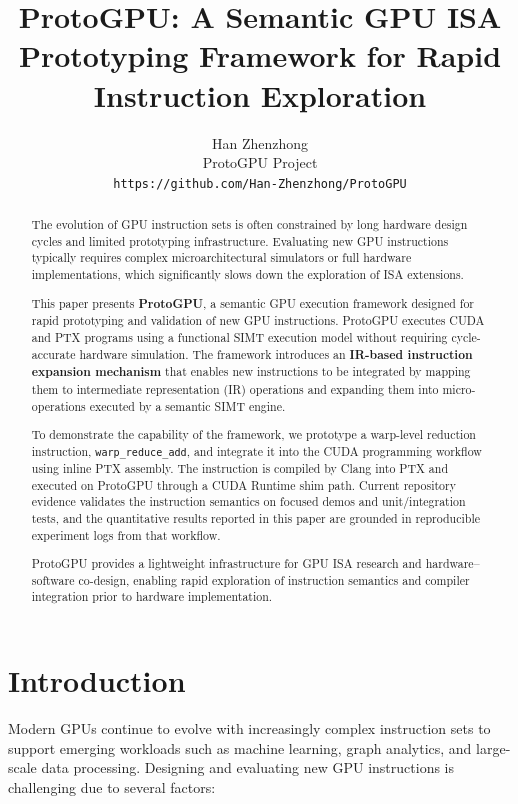 \documentclass[11pt]{article}
\title{ProtoGPU: A Semantic GPU ISA Prototyping Framework for Rapid Instruction Exploration}
\author{Han Zhenzhong \\ ProtoGPU Project \\ \texttt{https://github.com/Han-Zhenzhong/ProtoGPU}}
\date{}
\begin{document}
\maketitle

\begin{abstract}



The evolution of GPU instruction sets is often constrained by long
hardware design cycles and limited prototyping infrastructure.
Evaluating new GPU instructions typically requires complex
microarchitectural simulators or full hardware implementations, which
significantly slows down the exploration of ISA extensions.

This paper presents \textbf{ProtoGPU}, a semantic GPU execution
framework designed for rapid prototyping and validation of new GPU
instructions. ProtoGPU executes CUDA and PTX programs using a functional
SIMT execution model without requiring cycle-accurate hardware
simulation. The framework introduces an \textbf{IR-based instruction
expansion mechanism} that enables new instructions to be integrated by
mapping them to intermediate representation (IR) operations and
expanding them into micro-operations executed by a semantic SIMT engine.

To demonstrate the capability of the framework, we prototype a
warp-level reduction instruction, \texttt{warp\_reduce\_add}, and
integrate it into the CUDA programming workflow using inline PTX
assembly. The instruction is compiled by Clang into PTX and executed on
ProtoGPU through a CUDA Runtime shim path. Current repository evidence
validates the instruction semantics on focused demos and
unit/integration tests, and the quantitative results reported in this
paper are grounded in reproducible experiment logs from that workflow.

ProtoGPU provides a lightweight infrastructure for GPU ISA research and
hardware--software co-design, enabling rapid exploration of instruction
semantics and compiler integration prior to hardware implementation.

\end{abstract}


\hypertarget{introduction}{%
\section{Introduction}\label{introduction}}

Modern GPUs continue to evolve with increasingly complex instruction
sets to support emerging workloads such as machine learning, graph
analytics, and large-scale data processing. Designing and evaluating new
GPU instructions is challenging due to several factors:
\end{document}
